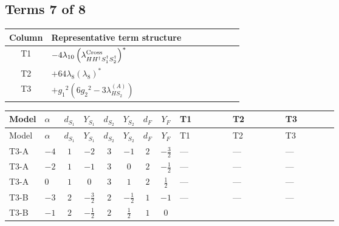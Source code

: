 \documentclass[8pt]{article}
\begin{document}
\begin{landscape}
\subsection*{Terms 7 of 8}
\begin{center}
\begin{tabular}{@{}c >{\raggedright\arraybackslash}p{0.82\linewidth}@{}}
\toprule
Column & Representative term structure \\
\midrule
T1 & \(\displaystyle -4 {\lambda_{10}} \left({\lambda_{H H^\dagger S_1^\dagger S_2^\dagger}^{\rm Cross}}\right)^{*}\) \\
\midrule
T2 & \(\displaystyle +64 {\lambda_{8}} \left({\lambda_{8}}\right)^{*}\) \\
\midrule
T3 & \(\displaystyle +{g_1}^2 \left(6 {g_2}^2-3 {\lambda_{HS_2}^{(A)}}\right)\) \\
\midrule
\bottomrule
\end{tabular}
\end{center}
\smallskip
\tiny
\begin{longtable}{@{}llcccccc >{\raggedright\arraybackslash}p{0.21\linewidth} >{\raggedright\arraybackslash}p{0.21\linewidth} >{\raggedright\arraybackslash}p{0.21\linewidth}@{}}
\toprule
Model & $\alpha$ & $d_{S_1}$ & $Y_{S_1}$ & $d_{S_2}$ & $Y_{S_2}$ & $d_F$ & $Y_F$ & T1 & T2 & T3 \\
\midrule
\endfirsthead
\toprule
Model & $\alpha$ & $d_{S_1}$ & $Y_{S_1}$ & $d_{S_2}$ & $Y_{S_2}$ & $d_F$ & $Y_F$ & T1 & T2 & T3 \\
\midrule
\endhead
T3-A & $-4$ & $1$ & $-2$ & $3$ & $-1$ & $2$ & $-\frac{3}{2}$ & --- & --- & --- \\
\midrule
T3-A & $-2$ & $1$ & $-1$ & $3$ & $0$ & $2$ & $-\frac{1}{2}$ & --- & --- & --- \\
\midrule
T3-A & $0$ & $1$ & $0$ & $3$ & $1$ & $2$ & $\frac{1}{2}$ & --- & --- & --- \\
\midrule
T3-B & $-3$ & $2$ & $-\frac{3}{2}$ & $2$ & $-\frac{1}{2}$ & $1$ & $-1$ & --- & --- & --- \\
\midrule
T3-B & $-1$ & $2$ & $-\frac{1}{2}$ & $2$ & $\frac{1}{2}$ & $1$ & $0$ & \scriptsize\adjustbox{max width=\linewidth}{$\begin{gathered} -4 {\lambda_{10}} \left({\lambda_{H H^\dagger S_1^\dagger S_2^\dagger}^{\rm Cross}}\right)^{*}\end{gathered}$} & \scriptsize\adjustbox{max width=\linewidth}{$\begin{gathered} +64 {\lambda_{8}} \left({\lambda_{8}}\right)^{*}\end{gathered}$} & \scriptsize\adjustbox{max width=\linewidth}{$\begin{gathered} +{g_1}^2 \left(6 {g_2}^2-3 {\lambda_{HS_2}^{(A)}}\right)\end{gathered}$} \\

\end{longtable}
\end{landscape}
\end{document}
